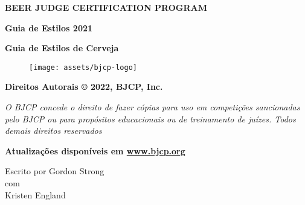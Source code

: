 \begin{titlepage}

    \centering
        {\fontsize{20}{32}\selectfont \textbf{BEER JUDGE CERTIFICATION PROGRAM}}\\

        \vspace{0.8cm}

        {\fontsize{30}{38}\selectfont \textbf{Guia de Estilos 2021 }}\\

        \vspace{0.8cm}

        {\fontsize{26}{32}\selectfont \textbf{Guia de Estilos de Cerveja}}\\

        \begin{figure}[htp]
            \centering
            \texttt{[image: assets/bjcp-logo]}
            \label{fig:bjcp-logo}
        \end{figure}

        {\fontsize{12}{32}\selectfont \textbf{Direitos Autorais © 2022, BJCP, Inc.}}\\

        \vspace{0.3cm}

        {\fontsize{10}{32}\selectfont\textit{
            O BJCP concede o direito de fazer cópias para uso em competições sancionadas \break
            pelo BJCP ou para propósitos educacionais ou de treinamento de juízes.\break
            Todos demais direitos reservados
        }}\\

        \vspace{0.3cm}

        {\fontsize{12}{32}\selectfont \textbf{Atualizações disponíveis em \href{http://www.bjcp.org}{www.bjcp.org}}}\\

        \vspace{0.3cm}

        {\fontsize{12}{32}\selectfont Escrito por Gordon Strong}\\
        {\fontsize{9}{32}\selectfont com}\\
        {\fontsize{10}{32}\selectfont Kristen England}\\

        \vspace{0.5cm}


\end{titlepage}
